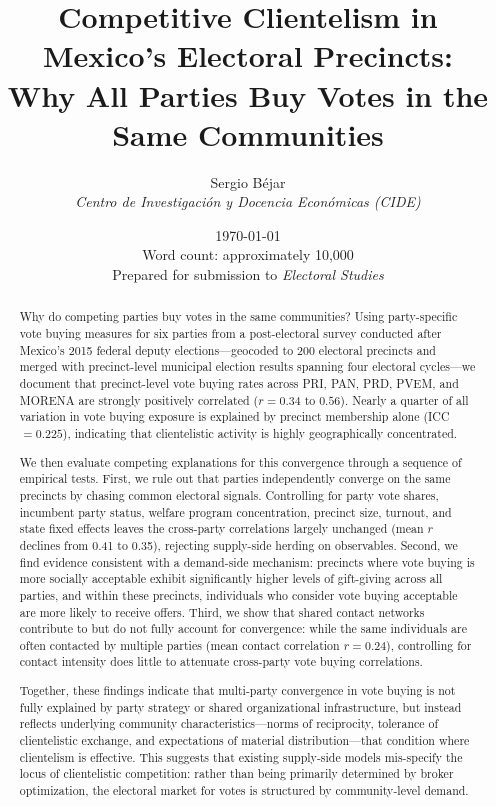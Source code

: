 \documentclass[12pt,letterpaper]{article}
\title{\textbf{Competitive Clientelism in Mexico's Electoral Precincts:\\ Why All Parties Buy Votes in the Same Communities}}
\author{Sergio B\'{e}jar\\
\textit{Centro de Investigaci\'{o}n y Docencia Econ\'{o}micas (CIDE)}}
\date{\today \\ \vspace{0.5cm} \small Word count: approximately 10,000 \\ \small Prepared for submission to \textit{Electoral Studies}}
\begin{document}
\maketitle

\begin{abstract}
\noindent Why do competing parties buy votes in the same communities? Using party-specific vote buying measures for six parties from a post-electoral survey conducted after Mexico's 2015 federal deputy elections---geocoded to 200 electoral precincts and merged with precinct-level municipal election results spanning four electoral cycles---we document that precinct-level vote buying rates across PRI, PAN, PRD, PVEM, and MORENA are strongly positively correlated ($r = 0.34$ to $0.56$). Nearly a quarter of all variation in vote buying exposure is explained by precinct membership alone (ICC $= 0.225$), indicating that clientelistic activity is highly geographically concentrated.

We then evaluate competing explanations for this convergence through a sequence of empirical tests. First, we rule out that parties independently converge on the same precincts by chasing common electoral signals. Controlling for party vote shares, incumbent party status, welfare program concentration, precinct size, turnout, and state fixed effects leaves the cross-party correlations largely unchanged (mean $r$ declines from 0.41 to 0.35), rejecting supply-side herding on observables. Second, we find evidence consistent with a demand-side mechanism: precincts where vote buying is more socially acceptable exhibit significantly higher levels of gift-giving across all parties, and within these precincts, individuals who consider vote buying acceptable are more likely to receive offers. Third, we show that shared contact networks contribute to but do not fully account for convergence: while the same individuals are often contacted by multiple parties (mean contact correlation $r = 0.24$), controlling for contact intensity does little to attenuate cross-party vote buying correlations.

Together, these findings indicate that multi-party convergence in vote buying is not fully explained by party strategy or shared organizational infrastructure, but instead reflects underlying community characteristics---norms of reciprocity, tolerance of clientelistic exchange, and expectations of material distribution---that condition where clientelism is effective. This suggests that existing supply-side models mis-specify the locus of clientelistic competition: rather than being primarily determined by broker optimization, the electoral market for votes is structured by community-level demand.
\end{abstract}
\end{document}

